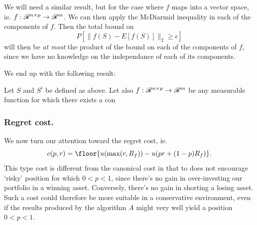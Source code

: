 We will need a similar result, but for the case where $f$ maps into a vector space,
ie. $f:\mathscr{R}^{n\times p}\to\mathscr{R}^m$. We can then apply the McDiarmid inequality in each of
the components of $f$. Then the total bound on
\begin{equation*}
  P[\|f(S) - E[f(S)]\|_2 \geq \epsilon]
\end{equation*}
will then be \textit{at most} the product of the bound on each of the components of $f$,
since we have no knowledge on the independance of each of its components. 

We end up with the following result:
\begin{thm}
  Let $S$ and $S^i$ be defined as above. Let also $f: \mathscr{R}^{n\times p}\to\mathscr{R}^m$ be any
  measurable function for which there exists a con
\end{thm}


\subsubsection{Regret cost.}

We now turn our attention toward the regret cost, ie.
\begin{equation*}
  c(p,r) = \floor{u(\max(r,R_f)) - u(pr + (1-p)R_f)}.
\end{equation*}
This type cost is different from the canonical cost in that to does not encourage `risky'
position for which $0<p<1$, since there's no gain in over-investing our portfolio in a
winning asset. Conversely, there's no gain in shorting a losing asset. Such a cost could
therefore be more suitable in a conservative environment, even if the results produced by
the algorithm $A$ might very well yield a position $0<p<1$.

